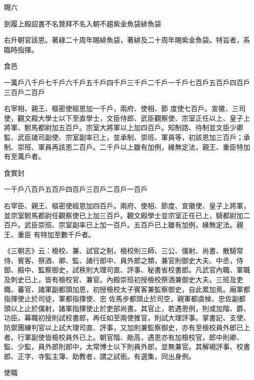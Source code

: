 \begin{pinyinscope}
 賜六



 劍履上殿詔書不名贊拜不名入朝不趨紫金魚袋緋魚袋



 右升朝官該恩。著綠二十周年賜緋魚袋，著緋及二十周年賜紫金魚袋。特旨者，系臨時指揮。



 食邑



 一萬戶八千戶七千戶六千戶五千戶四千戶三千戶二千戶一千戶七百戶五百戶四百戶三百戶二百戶



 右宰相、親王、樞密使經恩加一千戶，兩府、使相、節
 度使七百戶。宣徽、三司使，觀文殿大學士以下至直學士，文臣侍郎、武臣觀察使、宗室正任以上、皇子上將軍、駙馬都尉加五百戶。宗室大將軍以上加四百戶。知制誥、待制並文臣少卿監、武臣諸司副使、宗室副率已上，並承制、崇班、軍員等，初該恩加三百戶；承制、崇班、軍員再該恩二百戶。二千戶以上雖有加例，緣無定法，親王、重臣特加有至萬戶者。



 食實封



 一千戶八百戶五百戶四百戶三百戶二百戶一百戶



 右宰臣、親王、樞密使經恩加四百戶。兩府、使相、節度、宣徽使、皇子上將軍，並宗室駙馬都尉任觀察使已上加三百戶。觀文殿學士並宗室正任已上，騎都尉加二百戶。武臣崇班、宗室副率已上加一百戶。五百戶已上雖有加例，緣無定法。親王、重臣
 有特加至數千戶者。



 《三朝志》云：檢校、兼、試官之制，檢校則三師、三公、僕射、尚書、散騎常侍、賓客、祭酒、卿、監、諸行郎中、員外郎之類，兼官則御史大夫、中丞，侍御、殿中、監察御史，試秩則大理司直、評事、秘書省校書郎。凡武官內職、軍職及刺史已上，皆有檢校官、兼官。內殿崇班初授檢校祭酒兼御史大夫。三班及吏職、蕃官、諸軍副都頭加恩，初授檢校太子賓客兼監察御史，自此累加焉。廂軍都指揮使止於司徒，軍都指揮使、忠
 佐馬步都頭止於司空，親軍都虞候、忠佐副都頭以上止於僕射，諸軍指揮使止於吏部尚書。其官止，若遇恩例，則或加階、爵、功臣。幕職初授則試校書郎，再任如至兩使推官，則試大理評事。掌書記、支使、防禦團練判官以上試大理司直、評事，又加則兼監察御史，亦有至檢校員外郎已上者。行軍副使皆檢校員外已上。朝官階、勛高，遇恩亦有加檢校官，郎中則卿、監、少監，員外郎則郎中，太常博士以下則員外郎，並無兼官。其解褐評事、校書郎、正字、寺監主簿、助教者，謂之試銜。有選集，同出身例。



 使職




\end{pinyinscope}

